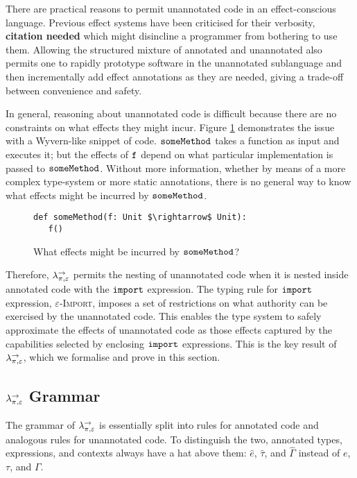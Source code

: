 There are practical reasons to permit unannotated code in an effect-conscious language. Previous effect systems have been criticised for their verbosity, \textbf{citation needed} which might disincline a programmer from bothering to use them. Allowing the structured mixture of annotated and unannotated also permits one to rapidly prototype software in the unannotated sublanguage and then incrementally add effect annotations as they are needed, giving a trade-off between convenience and safety.

In general, reasoning about unannotated code is difficult because there are no constraints on what effects they might incur. Figure \ref{fig:unannotated_reasoning} demonstrates the issue with a Wyvern-like snippet of code. $\mathtt{someMethod}$ takes a function as input and executes it; but the effects of $\mathtt{f}$ depend on what particular implementation is passed to $\mathtt{someMethod}$. Without more information, whether by means of a more complex type-system or more static annotations, there is no general way to know what effects might be incurred by $\mathtt{someMethod}$.

\begin{figure}[h]
\begin{lstlisting}
def someMethod(f: Unit $\rightarrow$ Unit):
   f()
\end{lstlisting}
\vspace{-7pt}
\caption{What effects might be incurred by $\mathtt{someMethod}$?}
\label{fig:unannotated_reasoning}
\end{figure}

Therefore, $\lambda^{\rightarrow}_{\pi, \varepsilon}$ permits the nesting of unannotated code when it is nested inside annotated code with the $\mathtt{import}$ expression. The typing rule for $\mathtt{import}$ expression, \textsc{$\varepsilon$-Import}, imposes a set of restrictions on what authority can be exercised by the unannotated code. This enables the type system to safely approximate the effects of unannotated code as those effects captured by the capabilities selected by enclosing $\mathtt{import}$ expressions. This is the key result of $\lambda^{\rightarrow}_{\pi, \varepsilon}$, which we formalise and prove in this section.


\subsection{$\lambda^{\rightarrow}_{\pi, \varepsilon}$ Grammar}

The grammar of $\lambda^{\rightarrow}_{\pi, \varepsilon}$ is essentially split into rules for annotated code and analogous rules for unannotated code. To distinguish the two, annotated types, expressions, and contexts always have a hat above them: $\hat e$, $\hat \tau$, and $\hat \Gamma$ instead of $e$, $\tau$, and $\Gamma$.

